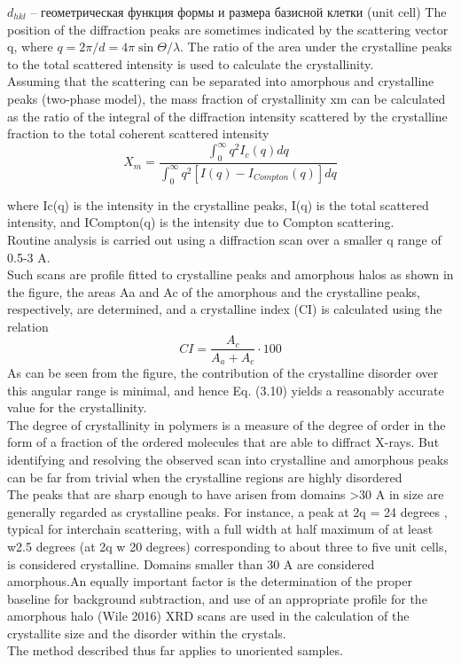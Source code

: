 $d_{hkl}$ -- геометрическая функция формы и размера базисной клетки (unit cell)
The position of the diffraction peaks are sometimes indicated by the scattering vector q, where $q = 2\pi/d = 4\pi \sin \Theta / \lambda$. The ratio of the area under the crystalline peaks
to the total scattered intensity is used to calculate the crystallinity.\\
Assuming that the scattering can be separated into amorphous and crystalline
peaks (two-phase model), the mass fraction of crystallinity xm can be calculated
as the ratio of the integral of the diffraction intensity scattered by the crystalline fraction
to the total coherent scattered intensity
\[
X_m = \frac{\int_0^{\infty} q^2 I_c(q) dq}{\int_0^{\infty} q^2 [I(q) - I_{Compton}(q)] dq}
\]

where Ic(q) is the intensity in the crystalline peaks, I(q) is the total scattered
intensity, and ICompton(q) is the intensity due to Compton scattering.\\
Routine analysis is carried out using a diffraction
scan over a smaller q range of 0.5-3 A.\\
Such scans are profile fitted to crystalline peaks and amorphous halos
as shown in the figure, the areas Aa and Ac of the amorphous and the crystalline
peaks, respectively, are determined, and a crystalline index (CI) is calculated using
the relation
\[
CI = \frac{A_c}{A_a+A_c} \cdot 100
\]
As can be seen from the figure, the contribution of the crystalline disorder over this
angular range is minimal, and hence Eq. (3.10) yields a reasonably accurate value for
the crystallinity.\\
The degree of crystallinity in polymers is a measure of the degree of order in the
form of a fraction of the ordered molecules that are able to diffract X-rays. But
identifying and resolving the observed scan into crystalline and amorphous peaks
can be far from trivial when the crystalline regions are highly disordered\\
The peaks that are sharp enough to have arisen from domains >30 A
in size are
generally regarded as crystalline peaks. For instance, a peak at 2q = 24 degrees , typical for interchain scattering, with a full width at half maximum of at least w2.5 degrees (at 2q w 20 degrees) corresponding to about
three to five unit cells, is considered crystalline. Domains smaller than 30 A are considered amorphous.An equally important factor is the determination of the
proper baseline for background subtraction, and use of an appropriate profile for
the amorphous halo (Wile 2016)
XRD scans are used in the calculation of
the crystallite size and the disorder within the crystals.\\
The method described thus far applies to unoriented samples.\\




